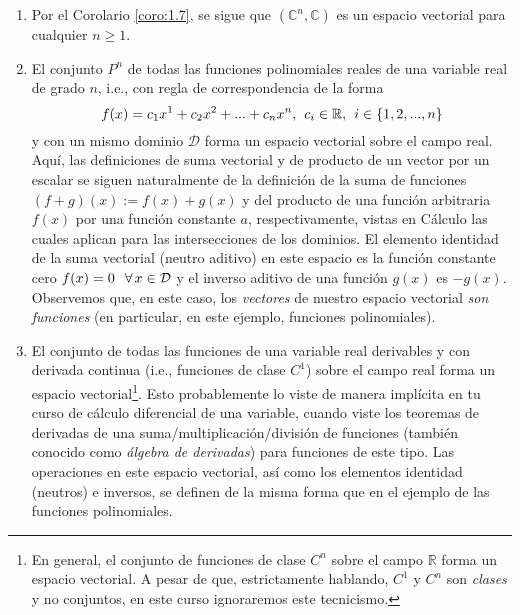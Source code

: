\documentclass[notasLineal]{subfiles}
\begin{document}
\begin{Ejem}\label{Ejem: Más espacios vectoriales}\leavevmode
    \begin{enumerate}[label=(\arabic*)]
    
        \item Por el Corolario \ref{coro:1.7}, se sigue que $(\mathbb{C}^n,\mathbb{C})$ es un espacio vectorial para cualquier $n\ge 1$.

        \item El conjunto $P^n$ de todas las funciones polinomiales reales de una variable real de grado $n$, i.e., con regla de correspondencia de la forma $$f(x) = c_1 x^1 + c_2 x^2 + ... + c_n x^n, \hspace{1.5mm} c_i \in \mathbb{R}, \hspace{1.5mm} i \in \{1,2,...,n\}$$ y con un mismo dominio $\mathcal{D}$ forma un espacio vectorial sobre el campo real. Aquí, las definiciones de suma vectorial y de producto de un vector por un escalar se siguen naturalmente de la definición de la suma de funciones $(f+g)(x):= f(x)+g(x)$ y del producto de una función arbitraria $f(x)$ por una función constante $a$, respectivamente, vistas en Cálculo \textemdash las cuales aplican para las intersecciones de los dominios. El elemento identidad de la suma vectorial (neutro aditivo) en este espacio es la función constante cero $f(x)=0\hspace{2.5mm} \forall\hspace{0.5mm}x\in\mathcal{D}$ y el inverso aditivo de una función $g(x)$ es $-g(x)$. Observemos que, en este caso, los \emph{vectores} de nuestro espacio vectorial \emph{son funciones} (en particular, en este ejemplo, funciones polinomiales).

        \item El conjunto de todas las funciones de una variable real derivables y con derivada continua (i.e., funciones de clase $C^1$) sobre el campo real forma un espacio vectorial\footnote{En general, el conjunto de funciones de clase $C^n$ sobre el campo $\mathbb{R}$ forma un espacio vectorial. A pesar de que, estrictamente hablando, $C^1$ y $C^n$ son \emph{clases} y no conjuntos, en este curso ignoraremos este tecnicismo.}. Esto probablemente lo viste de manera implícita en tu curso de cálculo diferencial de una variable, cuando viste los teoremas de derivadas de una suma/multiplicación/división de funciones (también conocido como \emph{álgebra de derivadas}) para funciones de este tipo. Las operaciones en este espacio vectorial, así como los elementos identidad (neutros) e inversos, se definen de la misma forma que en el ejemplo de las funciones polinomiales.
    \end{enumerate}
\end{Ejem}
\end{document}
